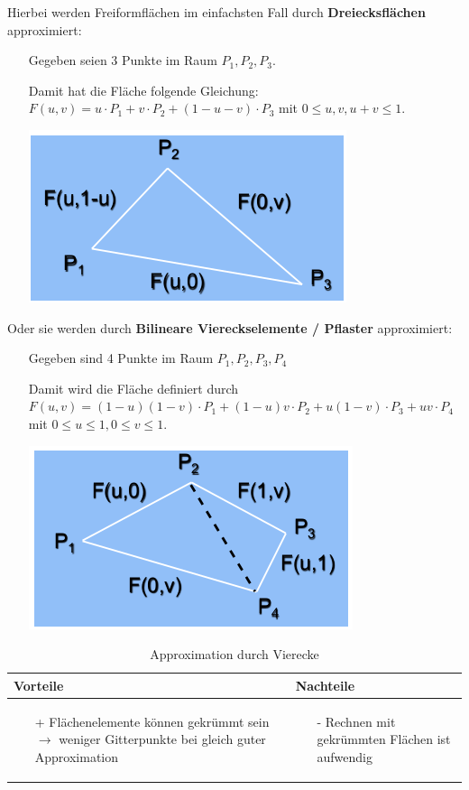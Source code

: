 \newpage
Hierbei werden Freiformflächen im einfachsten Fall durch \textbf{Dreiecksflächen} approximiert:
\begin{itemize}
\item[] Gegeben seien 3 Punkte im Raum $P_1 , P_2 , P_3$.
\item[] Damit hat die Fläche folgende Gleichung: $F(u,v)=u\cdot P_1 +v\cdot P_2 +(1-u-v)\cdot P_3$ mit $0 \leq u,v, u+v \leq 1$.
\begin{center}
\includegraphics[width=.3\linewidth]{figures/ch02_dreieck.png}
\end{center}
\end{itemize}
Oder sie werden durch \textbf{Bilineare Viereckselemente / Pflaster} approximiert:
\begin{itemize}
\item[] Gegeben sind 4 Punkte im Raum $P_1 , P_2 , P_3, P_4$
\item[] Damit wird die Fläche definiert durch $F(u,v)=(1-u)(1-v) \cdot P_1 + (1-u)v \cdot P_2 + u(1-v) \cdot P_3 + uv \cdot P_4$ mit $0 \leq u \leq 1, 0 \leq v \leq 1$. 
\begin{center}
\includegraphics[width=.3\linewidth]{figures/ch02_pflaster.png}
\end{center}
\end{itemize}
\begin{table}[hbt]
\centering
\begin{tabular}{|p{6.5cm}|p{6.5cm}|}
\hline
Vorteile & Nachteile\\
\hline
\vspace{-5mm}
\begin{itemize}
\setlength\itemsep{0em}
\item[+] Flächenelemente können gekrümmt sein
$\rightarrow$ weniger Gitterpunkte bei gleich guter Approximation
\end{itemize}
 &
 \vspace{-5mm}
\begin{itemize}
\setlength\itemsep{0em}
\item[-] Rechnen mit gekrümmten Flächen ist aufwendig
\end{itemize}\\
\hline
\end{tabular}
\caption{Approximation durch Vierecke}
\label{tab:Viereck_approx}
\end{table}
